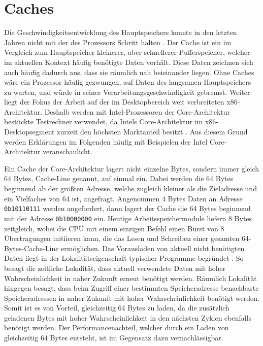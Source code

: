
\section{Caches}

Die Geschwindigkeitsentwicklung des Hauptspeichers konnte in den letzten Jahren nicht mit der des Prozessors Schritt halten \cite{speedGapCPUandRAM}. Der Cache ist ein im Vergleich zum Hauptspeicher kleinerer, aber schnellerer Pufferspeicher, welcher im aktuellen Kontext häufig benötigte Daten vorhält. Diese Daten zeichnen sich auch häufig dadurch aus, dass sie räumlich nah beieinander liegen.
Ohne Caches wäre ein Prozessor häufig gezwungen, auf Daten des langsamen Hauptspeichers zu warten, und würde in seiner Verarbeitungsgeschwindigkeit gebremst. %
Weiter liegt der Fokus der Arbeit auf der im Desktopbereich weit verbreiteten x86-Architektur. Deshalb werden mit Intel-Prozessoren der Core-Architektur bestückte Testrechner verwendet, da Intels Core-Architektur im x86-Desktopsegment zurzeit den höchsten Marktanteil besitzt \cite{AMDIntelMarketShare}. Aus diesem Grund werden Erklärungen im Folgenden häufig mit Beispielen der Intel Core-Architektur veranschaulicht.

Ein Cache der Core-Architektur lagert nicht einzelne Bytes, sondern immer gleich 64 Bytes, Cache-Line genannt, auf einmal ein. Dabei werden die 64 Bytes beginnend ab der größten Adresse, welche zugleich kleiner als die Zieladresse und ein Vielfaches von 64 ist, angefragt.
Angenommen 4 Bytes Daten an Adresse \lstinline!0b10110111!
werden angefordert, dann lagert der Cache die 64 Bytes beginnend mit der Adresse \lstinline!0b10000000! ein.
Heutige Arbeitsspeichermodule liefern 8 Bytes zeitgleich, wobei die CPU mit einem einzigen Befehl einen Burst von 8 Übertragungen initiieren kann, die das Lesen und Schreiben einer gesamten 64-Bytes-Cache-Line ermöglichen.
Das Vorausladen von aktuell nicht benötigten Daten liegt in der Lokalitätseigenschaft typischer Programme begründet \cite{tanenbaumLocality}. So besagt die zeitliche Lokalität, dass aktuell verwendete Daten mit hoher Wahrscheinlichkeit in naher Zukunft erneut benötigt werden. Räumlich Lokalität hingegen besagt, dass beim Zugriff einer bestimmten Speicheradresse benachbarte Speicheradressen in naher Zukunft mit hoher Wahrscheinlichkeit benötigt werden.
Somit ist es von Vorteil, gleichzeitig 64 Bytes zu laden, da die zusätzlich geladenen Bytes mit hoher Wahrscheinlichkeit in den nächsten Zyklen ebenfalls benötigt werden. Der Performancenachteil, welcher durch ein Laden von gleichzeitig 64 Bytes entsteht, ist im Gegensatz dazu vernachlässigbar.

